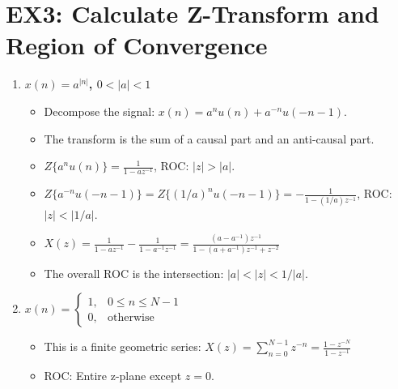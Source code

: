 \documentclass[a4paper,12pt]{article}
\begin{document}
\section*{EX3: Calculate Z-Transform and Region of Convergence}
\begin{enumerate}
    \item \textbf{$x(n) = a^{|n|}$, $0 < |a| < 1$}
        \begin{itemize}
            \item Decompose the signal: $x(n) = a^n u(n) + a^{-n} u(-n-1)$.
            \item The transform is the sum of a causal part and an anti-causal part.
            \item $Z\{a^n u(n)\} = \frac{1}{1-az^{-1}}$, ROC: $|z|>|a|$.
            \item $Z\{a^{-n} u(-n-1)\} = Z\{(1/a)^n u(-n-1)\} = -\frac{1}{1-(1/a)z^{-1}}$, ROC: $|z|<|1/a|$.
            \item $X(z) = \frac{1}{1-az^{-1}} - \frac{1}{1-a^{-1}z^{-1}} = \frac{(a-a^{-1})z^{-1}}{1-(a+a^{-1})z^{-1}+z^{-2}}$
            \item The overall ROC is the intersection: $|a| < |z| < 1/|a|$.
        \end{itemize}

    \item \textbf{$x(n) = \begin{cases} 1, & 0 \le n \le N-1 \\ 0, & \text{otherwise} \end{cases}$}
        \begin{itemize}
            \item This is a finite geometric series: $X(z) = \sum_{n=0}^{N-1} z^{-n} = \frac{1-z^{-N}}{1-z^{-1}}$
            \item ROC: Entire z-plane except $z=0$.
        \end{itemize}
\end{enumerate}
\end{document}
